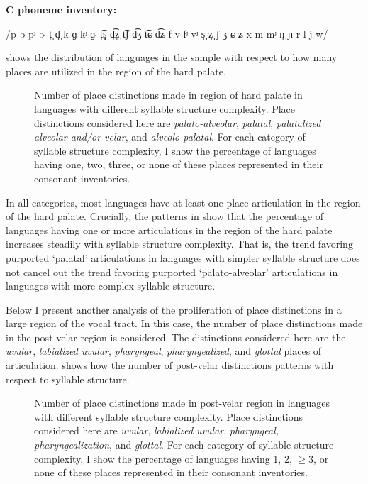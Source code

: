 \ea\label{ex:4.32}

\textbf{C phoneme inventory:} 

/p b pʲ bʲ t̪ d̪ k ɡ kʲ ɡʲ t̪͡s̪ d̪͡z̪ t͡ʃ d͡ʒ t͡ɕ d͡ʑ f v fʲ vʲ s̪ z̪ ʃ ʒ ɕ ʑ x m mʲ n̪ ɲ r l j w/
\z

   shows the distribution of languages in the sample with respect to how many places are utilized in the region of the hard palate.

\begin{figure}
\caption{\label{fig:4.10} Number of place distinctions made in region of hard palate in languages with different syllable structure complexity. Place distinctions considered here are \textit{palato-alveolar}, \textit{palatal}, \textit{palatalized alveolar and/or velar}, and \textit{alveolo-palatal}. For each category of syllable structure complexity, I show the percentage of languages having one, two, three, or none of these places represented in their consonant inventories.}
\end{figure}

  In all categories, most languages have at least one place articulation in the region of the hard palate. Crucially, the patterns in  show that the percentage of languages having one or more articulations in the region of the hard palate increases steadily with syllable structure complexity. That is, the trend favoring purported ‘palatal’ articulations in languages with simpler syllable structure does not cancel out the trend favoring purported ‘palato-alveolar’ articulations in languages with more complex syllable structure.

  Below I present another analysis of the proliferation of place distinctions in a large region of the vocal tract. In this case, the number of place distinctions made in the post-velar region is considered. The distinctions considered here are the \textit{uvular}, \textit{labialized uvular}, \textit{pharyngeal}, \textit{pharyngealized}, and \textit{glottal} places of articulation.  shows how the number of post-velar distinctions patterns with respect to syllable structure.

\begin{figure}
\caption{\label{fig:4.11} Number of place distinctions made in post-velar region in languages with different syllable structure complexity. Place distinctions considered here are \textit{uvular}, \textit{labialized uvular}, \textit{pharyngeal, pharyngealization}, and \textit{glottal}. For each category of syllable structure complexity, I show the percentage of languages having 1, 2, ${\geq}$3, or none of these places represented in their consonant inventories.}
\end{figure}

